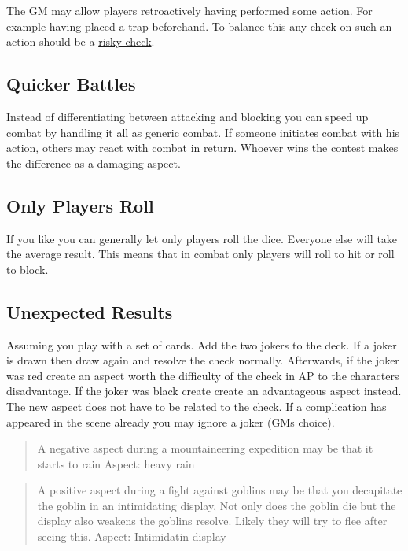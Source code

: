\documentclass[11pt]{article}
\begin{document}
{The GM may allow players retroactively having performed some action. For example having placed a trap beforehand. To balance this any check on such an action should be a \hyperref[sec:org94c7aba]{risky check}.

\subsection{Quicker Battles}
\label{sec:org37ee4c0}

Instead of differentiating between attacking and blocking you can speed up combat by handling it all as generic combat. If someone initiates combat with his action, others may react with combat in return. Whoever wins the contest makes the difference as a damaging aspect.

\subsection{Only Players Roll}
\label{sec:orga4375c7}
If you like you can generally let only players roll the dice. Everyone else will take the average result. This means that in combat only players will roll to hit or roll to block.

\subsection{Unexpected Results}
\label{sec:orga739436}
Assuming you play with a set of cards. Add the two jokers to the deck. If a joker is drawn then draw again and resolve the check normally. Afterwards, if the joker was red create an aspect worth the difficulty of the check in AP to the characters disadvantage. If the joker was black create create an advantageous aspect instead. The new aspect does not have to be related to the check.
If a complication has appeared in the scene already you may ignore a joker (GMs choice).

\begin{quote}
A negative aspect during a mountaineering expedition may be that it starts to rain
Aspect: heavy rain
\end{quote}

\begin{quote}
A positive aspect during a fight against goblins may be that you decapitate the goblin in an intimidating display, Not only does the goblin die but the display also weakens the goblins resolve. Likely they will try to flee after seeing this.
Aspect: Intimidatin display
\end{quote}

}
\end{document}
